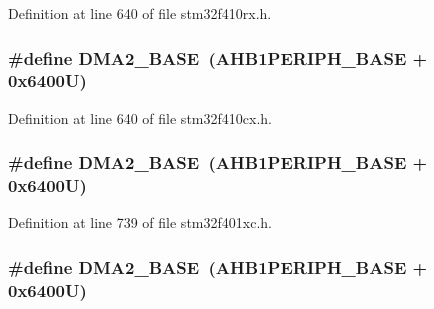 Definition at line 640 of file stm32f410rx.\+h.

\subsubsection[{\texorpdfstring{D\+M\+A2\+\_\+\+B\+A\+SE}{DMA2_BASE}}]{\setlength{\rightskip}{0pt plus 5cm}\#define D\+M\+A2\+\_\+\+B\+A\+SE~({\bf A\+H\+B1\+P\+E\+R\+I\+P\+H\+\_\+\+B\+A\+SE} + 0x6400\+U)}\hypertarget{group___peripheral__registers__structures_gab72a9ae145053ee13d1d491fb5c1df64}{}\label{group___peripheral__registers__structures_gab72a9ae145053ee13d1d491fb5c1df64}


Definition at line 640 of file stm32f410cx.\+h.

\subsubsection[{\texorpdfstring{D\+M\+A2\+\_\+\+B\+A\+SE}{DMA2_BASE}}]{\setlength{\rightskip}{0pt plus 5cm}\#define D\+M\+A2\+\_\+\+B\+A\+SE~({\bf A\+H\+B1\+P\+E\+R\+I\+P\+H\+\_\+\+B\+A\+SE} + 0x6400\+U)}\hypertarget{group___peripheral__registers__structures_gab72a9ae145053ee13d1d491fb5c1df64}{}\label{group___peripheral__registers__structures_gab72a9ae145053ee13d1d491fb5c1df64}


Definition at line 739 of file stm32f401xc.\+h.

\subsubsection[{\texorpdfstring{D\+M\+A2\+\_\+\+B\+A\+SE}{DMA2_BASE}}]{\setlength{\rightskip}{0pt plus 5cm}\#define D\+M\+A2\+\_\+\+B\+A\+SE~({\bf A\+H\+B1\+P\+E\+R\+I\+P\+H\+\_\+\+B\+A\+SE} + 0x6400\+U)}\hypertarget{group___peripheral__registers__structures_gab72a9ae145053ee13d1d491fb5c1df64}{}\label{group___peripheral__registers__structures_gab72a9ae145053ee13d1d491fb5c1df64}


